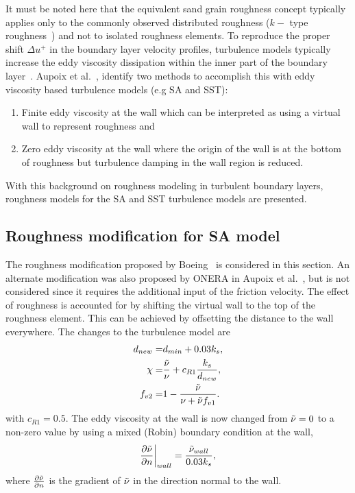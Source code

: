 It must be noted here that the equivalent sand grain roughness concept typically applies only to the commonly observed distributed roughness ($k-$ type roughness~\cite{ref:langel2014}) and not to isolated roughness elements. 
To reproduce the proper shift $\Delta u^+$ in the boundary layer velocity profiles, turbulence models typically increase the eddy viscosity dissipation within the inner part of the boundary layer~\cite{SAroughorig}. Aupoix et al.~\cite{SAroughorig}, identify two methods to accomplish this with eddy viscosity based turbulence models (e.g SA and SST):
\begin{enumerate}
    \item Finite eddy viscosity at the wall which can be interpreted as using a virtual wall to represent roughness and
    \item Zero eddy viscosity at the wall where the origin of the wall is at the bottom of roughness but turbulence damping in the wall region is reduced.
\end{enumerate}{}
With this background on roughness modeling in turbulent boundary layers, roughness models for the SA and SST turbulence models are presented.
\subsection{Roughness modification for SA model}
The roughness modification proposed by Boeing~\cite{spalart2000trends,SAroughorig} is considered in this section. An alternate modification was also proposed by ONERA in Aupoix et al.~\cite{SAroughorig}, but is not considered since it requires the additional input of the friction velocity. The effect of roughness is accounted for by shifting the virtual wall to the top of the roughness element. This can be achieved by offsetting the distance to the wall everywhere. The changes to the turbulence model are
\begin{eqnarray}
    d_{new} =& d_{min} + 0.03 k_s, \\
    \chi =& \frac{\Tilde{\nu}}{\nu}+c_{R1}\frac{k_s}{d_{new}}, \\ f_{v2} =& 1 - \frac{\Tilde{\nu}}{\nu + \Tilde{\nu}f_{v1}}.
\end{eqnarray}{}
\noindent with $c_{R1} = 0.5$. The eddy viscosity at the wall is now changed from $\Tilde{\nu}=0$ to a non-zero value by using a mixed (Robin) boundary condition at the wall,
\begin{equation}
    \frac{\partial \Tilde{\nu}}{\partial n}\bigg|_{wall} = \frac{\Tilde{\nu}_{wall}}{0.03 k_s},
\end{equation}{}
\noindent where $\frac{\partial \Tilde{\nu}}{\partial n}$ is the gradient of $\Tilde{\nu}$ in the direction normal to the wall.
